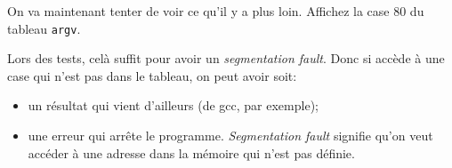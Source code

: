 \question On va maintenant tenter de voir ce qu'il y a plus
loin. Affichez la case 80 du tableau \texttt{argv}.

\begin{solution}
  Lors des tests, celà suffit pour avoir un \emph{segmentation
    fault}. Donc si accède à une case qui n'est pas dans le tableau, on peut
  avoir soit:
  \begin{itemize}
  \item un résultat qui vient d'ailleurs (de gcc, par exemple);
  \item une erreur qui arrête le programme. \emph{Segmentation fault}
    signifie qu'on veut accéder à une adresse dans la mémoire qui
    n'est pas définie.
  \end{itemize}
\end{solution}